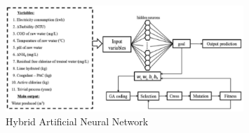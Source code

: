     \begin{figure}[htb]
        \centering
        \caption{Hybrid Artificial Neural Network}\label{fig:hybrid-artificial-nn}
        \includegraphics[width=0.8\textwidth,keepaspectratio]{img/01-introducao/hybrid-artificial-nn.pdf}
    \end{figure}

    \lipsum[2]

    

